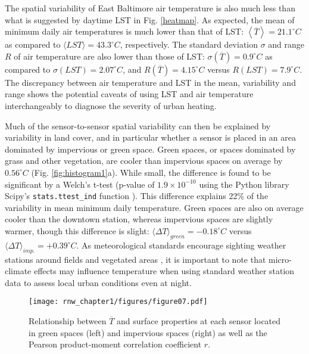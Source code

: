 The spatial variability of East Baltimore air temperature is also much less than what is suggested by daytime LST in Fig. \ref{heatmap}. As expected, the mean of minimum daily air temperatures is much lower than that of LST: $\left \langle \overline{T} \right \rangle = 21.1^{\circ} C$ as compared to $ \langle LST \rangle= 43.3^{\circ} C$, respectively. 
The standard deviation $\sigma$ and range $R$ of air temperature are also lower than those of LST:  $\sigma\left(\overline{T}\right) = 0.9^{\circ} C$ as compared to $\sigma\left( LST \right) = 2.07 ^{\circ} C$, and $R\left(\overline{T}\right) = 4.15^{\circ} C$ versus $R\left( LST \right) = 7.9 ^{\circ} C$. 
The discrepancy between air temperature and LST in the mean, variability and range shows the potential caveats of using LST and air temperature interchangeably to diagnose the severity of urban heating. 
 
Much of the sensor-to-sensor spatial variability can then be explained by variability in land cover, and in particular whether a sensor is placed in an area dominated by impervious or green space. Green spaces, or spaces dominated by grass and other vegetation, are cooler than impervious spaces on average by $0.56^{\circ} C$ (Fig. \ref{fig:histogram1}a). While small, the difference is found to be significant by a Welch's t-test (p-value of $1.9\times 10^{-10}$ using the Python library Scipy's \texttt{stats.ttest\_ind} function \citep{scipy}). This difference explains 22\% of the variability in mean minimum daily temperature.  
Green spaces are also on average cooler than the downtown station, whereas impervious spaces are slightly warmer, though this difference is slight: $\langle \Delta T \rangle _{green} = -0.18 ^{\circ} C$ versus $\langle \Delta T \rangle_{imp.} =+0.39 ^{\circ} C$.  As meteorological standards encourage sighting weather stations around fields and vegetated areas \citep{wmo}, it is important to note that micro-climate effects may influence temperature when using standard weather station data to assess local urban conditions even at night. 

\begin{figure} 
\noindent\texttt{[image: rnw\_chapter1/figures/figure07.pdf]}
\caption{Relationship between $\overline{T}$ and surface properties at each sensor located in green spaces (left) and impervious spaces (right) as well as the Pearson product-moment correlation coefficient $r$. }
\label{fig:geospatialcorrelation1}
\end{figure}


